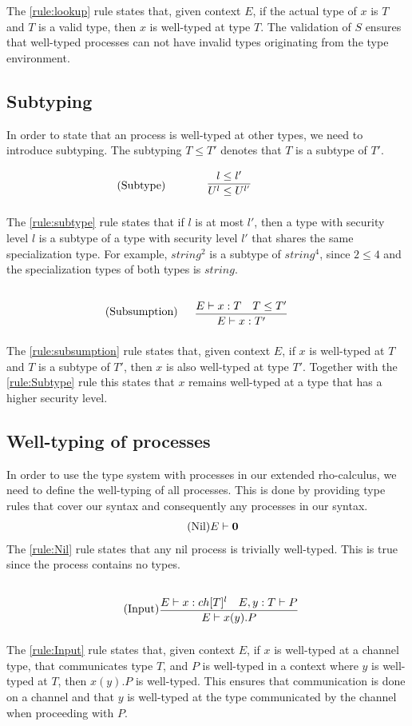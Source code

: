 The \ref{rule:lookup} rule states that, given context $E$, if the actual type of $x$ is $T$ and $T$ is a valid type, then $x$ is well-typed at type $T$.
The validation of $S$ ensures that well-typed processes can not have invalid types originating from the type environment.

\subsection{Subtyping}
In order to state that an process is well-typed at other types, we need to introduce subtyping.
The subtyping $T\leq T'$ denotes that $T$ is a subtype of $T'$. 

\begin{align*}
    \tag{Subtype}\label{rule:subtype} &\infrule{l\leq l'}{U^l\leq U^{l'}}
\end{align*}

The \ref{rule:subtype} rule states that if $l$ is at most $l'$, then a type with security level $l$ is a subtype of a type with security level $l'$ that shares the same specialization type.
For example, $string^2$ is a subtype of $string^4$, since $2\leq4$ and the specialization types of both types is $string$.

\begin{align*}
    \tag{Subsumption}\label{rule:subsumption} &\infrule{E\vdash x:T\quad T\leq T'}{E\vdash x:T'}
\end{align*}
The \ref{rule:subsumption} rule states that, given context $E$, if $x$ is well-typed at $T$ and $T$ is a subtype of $T'$, then $x$ is also well-typed at type $T'$.
Together with the \ref{rule:Subtype} rule this states that $x$ remains well-typed at a type that has a higher security level.

\subsection{Well-typing of processes}
In order to use the type system with processes in our extended rho-calculus, we need to define the well-typing of all processes.
This is done by providing type rules that cover our syntax and consequently any processes in our syntax.
\begin{align*}
    \tag{Nil}\label{rule:Nil} &E \vdash \mathbf{0}
\end{align*}
The \ref{rule:Nil} rule states that any nil process is trivially well-typed.
This is true since the process contains no types.

\begin{align*}
    \tag{Input}\label{rule:Input} &\infrule{E\vdash x:ch[T]^l\quad E,y:T\vdash P}{E \vdash \inp{x}{y}P}
\end{align*}
The \ref{rule:Input} rule states that, given context $E$, if $x$ is well-typed at a channel type, that communicates type $T$, and $P$ is well-typed in a context where $y$ is well-typed at $T$, then $x(y).P$ is well-typed.
This ensures that communication is done on a channel and that $y$ is well-typed at the type communicated by the channel when proceeding with $P$.

